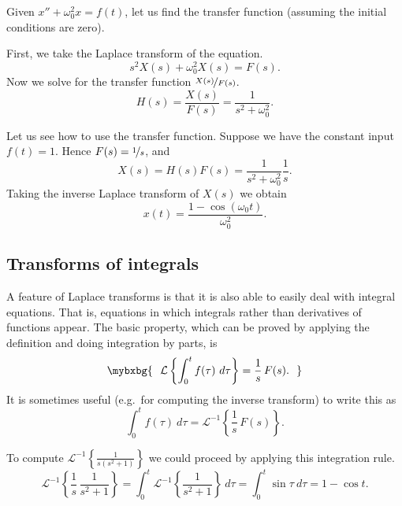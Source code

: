 \begin{example}
Given $x'' + \omega_0^2 x = f(t)$, let us find the transfer function
(assuming the initial conditions are zero).

First, we take the Laplace transform of the equation.
\begin{equation*}
s^2 X(s) + \omega_0^2 X(s) = F(s) .
\end{equation*}
Now we solve for the transfer function $\nicefrac{X(s)}{F(s)}$.
\begin{equation*}
H(s) = \frac{X(s)}{F(s)} = \frac{1}{s^2 + \omega_0^2} .
\end{equation*}

Let us see how to use the transfer function.  Suppose we have the constant input
$f(t) = 1$.  Hence $F(s) = \nicefrac{1}{s}$, and
\begin{equation*}
X(s) = H(s) F(s) = \frac{1}{s^2+\omega_0^2} \frac{1}{s} .
\end{equation*}
Taking the inverse Laplace transform of $X(s)$ we obtain
\begin{equation*}
x(t) = \frac{1-\cos(\omega_0 t)}{\omega_0^2} .
\end{equation*}
\end{example}

\subsection{Transforms of integrals}

A feature of Laplace transforms is that it is also able to easily deal
with integral equations.  That is, equations in which integrals rather than
derivatives of functions appear.  The basic property, which can be proved
by applying the definition and doing integration by parts, is 
\begin{equation*}
\mybxbg{~~
\mathcal{L} \left\{
\int_0^t f(\tau) ~ d\tau
\right\} = \frac{1}{s} \, F(s) .
~~}
\end{equation*}
It is sometimes useful (e.g.\ for computing the inverse transform) to write
this as
\begin{equation*}
\int_0^t f(\tau) ~ d\tau
=
{\mathcal{L}}^{-1} \left\{
\frac{1}{s} \, F(s) \right\} .
\end{equation*}

\begin{example}
To compute ${\mathcal{L}}^{-1} \left\{\frac{1}{s(s^2+1)}\right\}$ we could
proceed by applying this integration rule.  
\begin{equation*}
{\mathcal{L}}^{-1} \left\{
\frac{1}{s} \, \frac{1}{s^2+1} \right\} 
=
\int_0^t 
{\mathcal{L}}^{-1} \left\{
\frac{1}{s^2+1} \right\} ~ d\tau
=
\int_0^t 
\sin \tau ~ d\tau
=
1 - \cos t .
\end{equation*}
\end{example}


